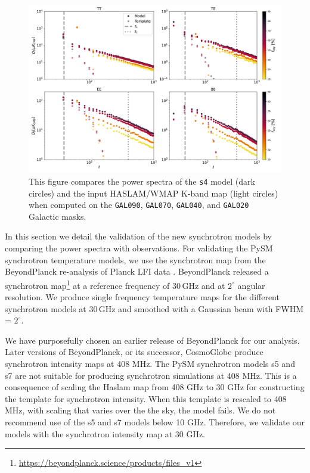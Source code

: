 \documentclass[twocolumn]{aastex631}
\begin{document}
\begin{figure}
    \centering
    \includegraphics[width=2.\columnwidth]{figures/synch_valspectra.pdf}
    \caption{This figure compares the power spectra of the \texttt{s4} model (dark circles) and the input HASLAM/WMAP K-band  map (light circles) when computed on the \texttt{GAL090}, \texttt{GAL070}, \texttt{GAL040}, and \texttt{GAL020} Galactic masks.}
    \label{fig:spectra_by_field}
\end{figure}
In this section we detail the validation of the new synchrotron models by comparing the power spectra with observations. For validating the PySM synchrotron temperature models, we use the synchrotron map from the BeyondPlanck re-analysis of Planck LFI data \citep{BeyondPlanck23}. BeyondPlanck released a synchrotron map\footnote{\url{https://beyondplanck.science/products/files\_v1}} at a reference frequency of 30\,GHz and at $2^\circ$ angular resolution. We produce single frequency temperature maps for the different synchrotron models at 30\,GHz and smoothed with a Gaussian beam with FWHM = $2^\circ$.

We have purposefully chosen an earlier release of BeyondPlanck for our analysis. Later versions of BeyondPlanck, or its successor, CosmoGlobe produce synchrotron intensity maps at 408 MHz. The PySM synchrotron models s5 and s7 are not suitable for producing synchrotron simulations at 408 MHz. This is a consequence of scaling the Haslam map from 408 GHz to 30 GHz for constructing the template for synchrotron intensity. When this template is rescaled to 408 MHz, with scaling that varies over the the sky, the model fails. We do not recommend use of the s5 and s7 models below 10 GHz. Therefore, we validate our models with the synchrotron intensity map at 30 GHz.
\end{document}
